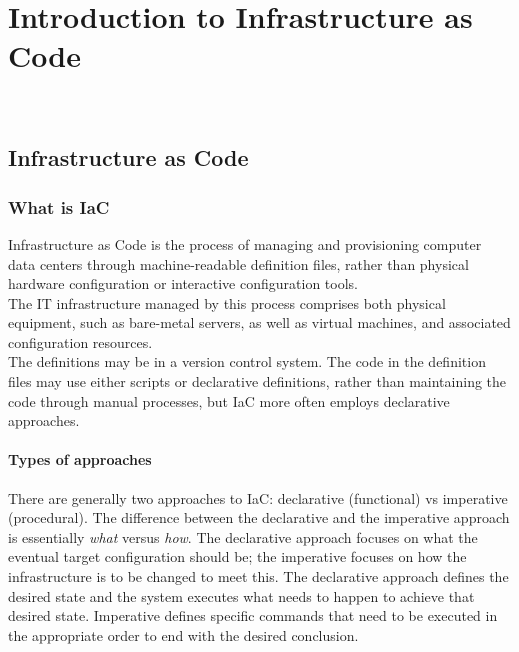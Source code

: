 
\chapter{Introduction to Infrastructure as Code}
\label{cap:introduction-to-iac}

\\

\section{Infrastructure as Code}

\subsection{What is IaC}
Infrastructure as Code is the process of managing and provisioning computer data centers through machine-readable definition files, rather than physical hardware configuration or interactive configuration tools. \\
The IT infrastructure managed by this process comprises both physical equipment, such as bare-metal servers, as well as virtual machines, and associated configuration resources. \\
The definitions may be in a version control system. The code in the definition files may use either scripts or declarative definitions, rather than maintaining the code through manual processes, but IaC more often employs declarative approaches.


\subsubsection{Types of approaches}

There are generally two approaches to IaC: declarative (functional) vs imperative (procedural). The difference between the declarative and the imperative approach is essentially \textit{what} versus \textit{how}.
The declarative approach focuses on what the eventual target configuration should be; the imperative focuses on how the infrastructure is to be changed to meet this.
The declarative approach defines the desired state and the system executes what needs to happen to achieve that desired state.
Imperative defines specific commands that need to be executed in the appropriate order to end with the desired conclusion.

